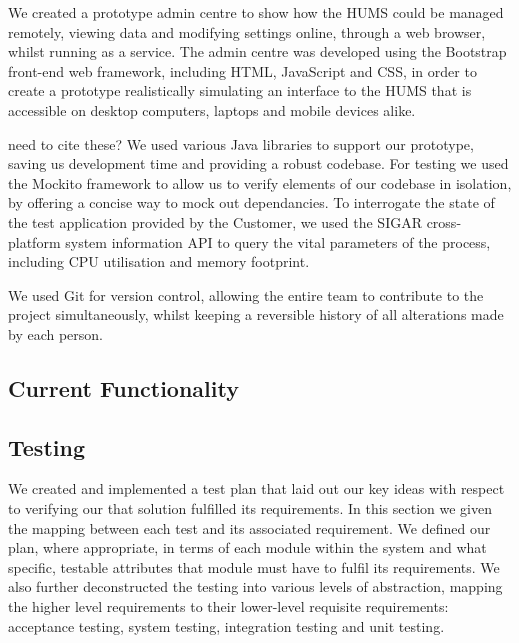 \documentclass[10pt,a4paper]{article}
\begin{document}
We created a prototype admin centre to show how the HUMS could be
managed remotely, viewing data and modifying settings online, through
a web browser, whilst running as a service. The admin centre was
developed using the Bootstrap front-end web framework, including 
HTML,
JavaScript and CSS, in order to create a prototype realistically
simulating an interface to the HUMS that is accessible on desktop
computers, laptops and mobile devices alike.

need to cite these?
We used various Java libraries to support our prototype, saving us 
development time and providing a robust codebase. For testing we used 
the Mockito framework to allow us to verify elements of our codebase in 
isolation, by offering a concise way to mock out dependancies. To 
interrogate the state of the test application provided by the Customer, we 
used the SIGAR cross-platform system information API to query the vital 
parameters of the process, including CPU utilisation and memory 
footprint.

We used Git for version control, allowing the entire team to
contribute to the project simultaneously, whilst keeping a reversible
history of all alterations made by each person.

\subsection{Current Functionality}

\subsection{Testing} 
We created and implemented a test plan that laid out our key ideas
with respect to verifying our that solution fulfilled its
requirements. In this section we given the mapping between each
test and its associated requirement. We
defined our plan, where appropriate, in terms of each module within
the system and what specific, testable attributes that module must
have to fulfil its requirements. We also further deconstructed the
testing into various levels of abstraction, mapping the higher level
requirements to their lower-level requisite requirements: acceptance
testing, system testing, integration testing and unit
testing.

\end{document}

